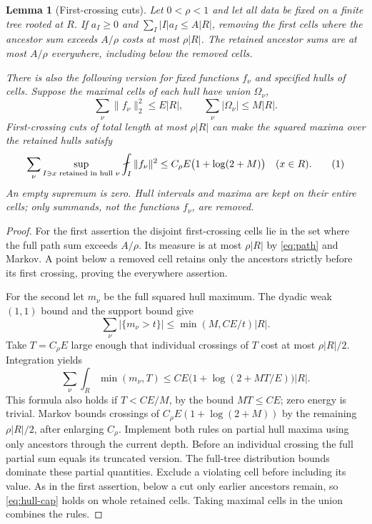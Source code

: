 \documentclass[11pt]{article}
\newtheorem{lemma}[theorem]{Lemma}
\theoremstyle{definition}
\newcommand{\avint}{\fint}
\newcommand{\eqtag}[1]{\refstepcounter{equation}\tag{\theequation}\label{#1}}
\numberwithin{equation}{section}
\begin{document}
\begin{lemma}[First-crossing cuts]\label{lem:cuts}
Let $0<\rho<1$ and let all data be fixed on a finite tree rooted at $R$.
If $a_I\ge0$ and $\sum_I|I|a_I\le A|R|$, removing the first cells where the ancestor sum exceeds $A/\rho$ costs at most $\rho|R|$. The retained ancestor sums are at most $A/\rho$ everywhere, including below the removed cells.

There is also the following version for fixed functions $f_\nu$ and specified hulls of cells. Suppose the maximal cells of each hull have union $\Omega_\nu$,
\[
 \sum_\nu\|f_\nu\|_2^2\le E|R|,\qquad
 \sum_\nu|\Omega_\nu|\le M|R|.
\]
First-crossing cuts of total length at most $\rho|R|$ can make the squared maxima over the retained hulls satisfy
\[
 \sum_\nu\sup_{I\ni x\text{ retained in hull }\nu}
       \avint_I\|f_\nu\|^2
 \le C_\rho E\bigl(1+\log(2+M)\bigr)
 \quad(x\in R).
 \eqtag{eq:hull-cap}
\]
An empty supremum is zero. Hull intervals and maxima are kept on their entire cells; only summands, not the functions $f_\nu$, are removed.
\end{lemma}
\begin{proof}
For the first assertion the disjoint first-crossing cells lie in the set where the full path sum exceeds $A/\rho$. Its measure is at most $\rho|R|$ by \eqref{eq:path} and Markov. A point below a removed cell retains only the ancestors strictly before its first crossing, proving the everywhere assertion.

For the second let $m_\nu$ be the full squared hull maximum. The dyadic weak $(1,1)$ bound and the support bound give
\[
 \sum_\nu|\{m_\nu>t\}|\le\min(M,CE/t)|R|.
\]
Take $T=C_\rho E$ large enough that individual crossings of $T$ cost at most $\rho|R|/2$. Integration yields
\[
 \sum_\nu\int_R\min(m_\nu,T)
 \le CE\bigl(1+\log(2+MT/E)\bigr)|R|.
\]
This formula also holds if $T<CE/M$, by the bound $MT\le CE$; zero energy is trivial. Markov bounds crossings of $C_\rho E(1+\log(2+M))$ by the remaining $\rho|R|/2$, after enlarging $C_\rho$. Implement both rules on partial hull maxima using only ancestors through the current depth. Before an individual crossing the full partial sum equals its truncated version. The full-tree distribution bounds dominate these partial quantities. Exclude a violating cell before including its value. As in the first assertion, below a cut only earlier ancestors remain, so \eqref{eq:hull-cap} holds on whole retained cells. Taking maximal cells in the union combines the rules.
\end{proof}
\end{document}
